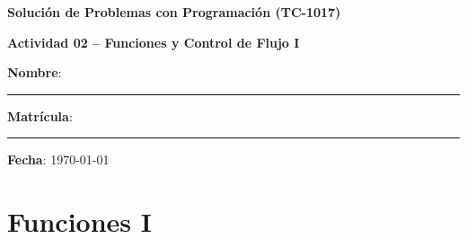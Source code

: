 \documentclass[spanish, 10pt]{article}
\begin{document}
\begin{center}
	{\Large \textbf{Solución de Problemas con Programación (TC-1017)}}
	
	\bigskip
	{\large \textbf{Actividad 02 -- Funciones y Control de Flujo I}}
\end{center}

\bigskip
{\large \textbf{Nombre}: \rule{13.7 cm}{0.4mm}}



\bigskip
{\large \textbf{Matrícula}: \rule{5 cm}{0.4mm}} \hfill {\large \textbf{Fecha}: \today}

\section{Funciones I}
\end{document}
